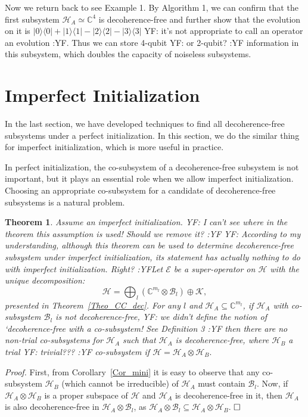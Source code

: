 \documentclass[journal]{IEEEtran}
\def\h{\ensuremath{\mathcal{H}}}
\def\k{\ensuremath{\mathcal{K}}}
\def\b{\ensuremath{\mathcal{B}}}
\def\e{\ensuremath{\mathcal{E}}}
\def\k{\mathcal{K}}
\newtheorem{theorem}{Theorem}
\newcommand{\authorComment}[3]{\color{#1}#2: {#3} :#2\color{black}}
\newcommand{\yf}[1]{\authorComment{blue}{YF}{#1}}
\begin{document}
Now we return back to see Example 1. By Algorithm 1, we can confirm that the first subsystem $\h_A\simeq\mathbb{C}^4$ is decoherence-free and further show that the evolution on it is $|0\rangle\langle0|+|1\rangle\langle1|-|2\rangle\langle2|-|3\rangle\langle3|$ \yf{it's not appropriate to call an operator an evolution}. Thus we can store 4-qubit \yf{or 2-qubit?} information in this subsystem, which doubles the capacity of  noiseless subsystems.  
\section{Imperfect Initialization}
In the last section, we have developed techniques to find all decoherence-free subsystems under a perfect initialization. In this section, we do the similar thing for imperfect initialization, which is more useful in practice. 

In perfect initialization, the co-subsystem of a decoherence-free subsystem is not important, but it plays an essential role when we allow imperfect initialization. Choosing an appropriate co-subsystem for a candidate of decoherence-free subsystems is a natural problem.   


\begin{theorem}\label{Theo_check_FT}
Assume an imperfect initialization. \yf{I can't see where in the theorem this assumption is used! Should we remove it?}  \yf{According to my understanding, although this theorem can be used to determine decoherence-free subsystem under imperfect initialization, its statement has actually nothing to do with imperfect initialization. Right?}Let $\e$ be a super-operator  on $\h$  with the unique decomposition:
$$\h=\bigoplus_l(\mathbb{C}^{m_l}\otimes \b_l)\oplus \k,$$
presented in Theorem~\ref{Theo_CC_dec}. For any $l$ and $\h_A\subseteq \mathbb{C}^{m_l}$, 
if $\h_A$ with co-subsystem $\b_l$ is not decoherence-free, \yf{we didn't define the notion of `decoherence-free with a co-subsystem! See Definition 3} then there are no non-trial co-subsystems for $\h_A$ such that $\h_A$ is decoherence-free, where $\h_B$ a trial \yf{trivial???} co-subsystem if $\h=\h_A\otimes\h_B.$ 
\end{theorem}

{\it Proof.}  First, from Corollary~\ref{Cor_mini} it is easy to observe that any co-subsystem $\h_B$ (which cannot be irreducible) of $\h_A$ must contain $\b_{l}$. Now, if $\h_A\otimes \h_B$ is a proper subspace of $\h$ and $\h_A$ is decoherence-free in it, then $\h_A$ is also decoherence-free in $\h_A\otimes \b_l$, as $\h_A\otimes \b_l\subseteq \h_A\otimes \h_B$. $\hfill \Box$
\end{document}
